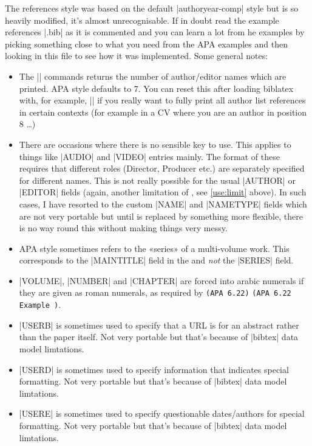 \documentclass{ltxdockit}
\newcommand\apa[2][]{\ifthenelse{\equal{#1}{}}%
                       {\texttt{(APA #2)}}%
                       {\texttt{(APA #2 Example #1)}}}
\begin{document}
The references style was based on the  default
|authoryear-comp| style but is so heavily modified, it's almost
unrecognisable. If in doubt read the example references |.bib| as it is
commented and you can learn a lot from he examples by picking something
close to what you need from the APA examples and then looking in this file
to see how it was implemented. Some general notes:
\begin{itemize}
\setlength{\itemsep}{0pt}
\item The |\maxprtauth| commands returns the number of author/editor
  names which are printed. APA style defaults to 7. You can reset this
  after loading biblatex with, for example,
  |\renewcommand{\maxprtauth}{25}| if you really want to fully print
  all author list references in certain contexts (for example in a CV
  where you are an author in position 8 \ldots)
\item There are occasions where there is no sensible  key to
  use. This applies to things like |AUDIO| and |VIDEO| entries mainly. The
  format of these requires that different roles (Director, Producer etc.)
  are separately specified for different names. This is not really possible
  for the usual |AUTHOR| or |EDITOR| fields (again, another limitation of
  \bibtex, see \ref{use:limit} above). In such cases, I have resorted to
  the  custom |NAME| and |NAMETYPE| fields which are not very
  portable but until \bibtex is replaced by something more flexible, there
  is no way round this without making things very messy.
\item APA style sometimes refers to the «series» of a multi-volume work.
  This corresponds to the |MAINTITLE| field in the  and
  \emph{not} the |SERIES| field.
\item |VOLUME|, |NUMBER| and |CHAPTER| are forced into arabic numerals if
  they are given as roman numerals, as required by \apa{6.22}.
\item |USERB| is sometimes used to specify that a URL is for an abstract
  rather than the paper itself. Not very portable but that's because of |bibtex| data
  model limtations.
\item |USERD| is sometimes used to specify information that indicates
  special formatting. Not very portable but that's because of |bibtex| data
  model limtations.
\item |USERE| is sometimes used to specify questionable dates/authors for
  special formatting. Not very portable but that's because of |bibtex| data
  model limtations.
\end{itemize}
\end{document}
